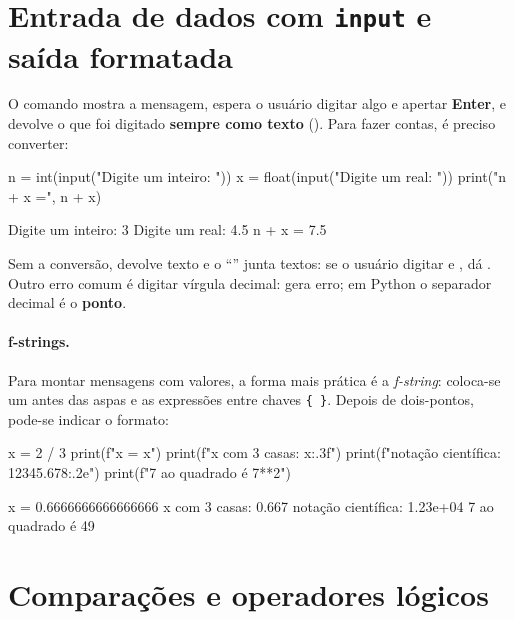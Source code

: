 {{%
\section{Entrada de dados com \texttt{input} e saída formatada}

O comando  mostra a mensagem, espera o usuário digitar algo e apertar \textbf{Enter}, e devolve
o que foi digitado \textbf{sempre como texto} (). Para fazer contas, é preciso converter:

\begin{entrada}
n = int(input("Digite um inteiro: "))
x = float(input("Digite um real: "))
print("n + x =", n + x)
\end{entrada}
\begin{saida}
Digite um inteiro: 3
Digite um real: 4.5
n + x = 7.5
\end{saida}

\begin{atencao}
Sem a conversão,  devolve texto e o ``\py{+}'' junta textos: se o usuário digitar  e ,
 dá . Outro erro comum é digitar vírgula decimal:  gera erro;
em Python o separador decimal é o \textbf{ponto}.
\end{atencao}

\paragraph{f-strings.} Para montar mensagens com valores, a forma mais prática é a \emph{f-string}: coloca-se um
 antes das aspas e as expressões entre chaves \texttt{\{\,\}}. Depois de dois-pontos, pode-se indicar o formato:

\begin{entrada}
x = 2 / 3
print(f"x = {x}")
print(f"x com 3 casas: {x:.3f}")
print(f"notação científica: {12345.678:.2e}")
print(f"{7} ao quadrado é {7**2}")
\end{entrada}
\begin{saida}
x = 0.6666666666666666
x com 3 casas: 0.667
notação científica: 1.23e+04
7 ao quadrado é 49
\end{saida}

\section{Comparações e operadores lógicos}

}}
